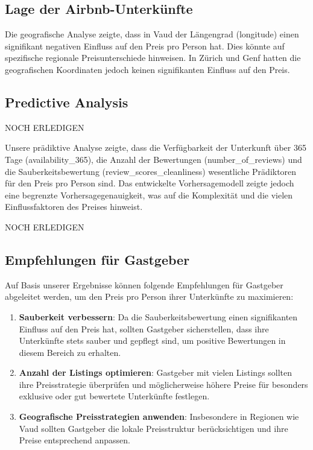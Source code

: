 \documentclass[
  journal,
]{IEEEtran}%
\begin{document}
\subsection{Lage der
Airbnb-Unterkünfte}\label{lage-der-airbnb-unterkuxfcnfte}

Die geografische Analyse zeigte, dass in Vaud der Längengrad (longitude)
einen signifikant negativen Einfluss auf den Preis pro Person hat. Dies
könnte auf spezifische regionale Preisunterschiede hinweisen. In Zürich
und Genf hatten die geografischen Koordinaten jedoch keinen
signifikanten Einfluss auf den Preis.

\subsection{Predictive Analysis}\label{predictive-analysis-2}

NOCH ERLEDIGEN

Unsere prädiktive Analyse zeigte, dass die Verfügbarkeit der Unterkunft
über 365 Tage (availability\_365), die Anzahl der Bewertungen
(number\_of\_reviews) und die Sauberkeitsbewertung
(review\_scores\_cleanliness) wesentliche Prädiktoren für den Preis pro
Person sind. Das entwickelte Vorhersagemodell zeigte jedoch eine
begrenzte Vorhersagegenauigkeit, was auf die Komplexität und die vielen
Einflussfaktoren des Preises hinweist.

NOCH ERLEDIGEN

\subsection{Empfehlungen für
Gastgeber}\label{empfehlungen-fuxfcr-gastgeber}

Auf Basis unserer Ergebnisse können folgende Empfehlungen für Gastgeber
abgeleitet werden, um den Preis pro Person ihrer Unterkünfte zu
maximieren:

\begin{enumerate}
\def\labelenumi{\arabic{enumi}.}
\item
  \textbf{Sauberkeit verbessern}: Da die Sauberkeitsbewertung einen
  signifikanten Einfluss auf den Preis hat, sollten Gastgeber
  sicherstellen, dass ihre Unterkünfte stets sauber und gepflegt sind,
  um positive Bewertungen in diesem Bereich zu erhalten.
\item
  \textbf{Anzahl der Listings optimieren}: Gastgeber mit vielen Listings
  sollten ihre Preisstrategie überprüfen und möglicherweise höhere
  Preise für besonders exklusive oder gut bewertete Unterkünfte
  festlegen.
\item
  \textbf{Geografische Preisstrategien anwenden}: Insbesondere in
  Regionen wie Vaud sollten Gastgeber die lokale Preisstruktur
  berücksichtigen und ihre Preise entsprechend anpassen.
\end{enumerate}
\end{document}
